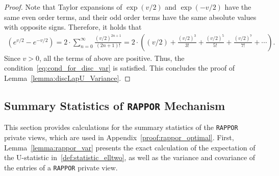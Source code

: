 \documentclass[twoside,11pt]{article}
\begin{document}
\begin{appendix}
\begin{lemma}
\begin{proof}
			Note that Taylor expansions of $\exp(v/2)$ and $\exp(-v/2)$ have the same even order terms, and their odd order terms have the same absolute values with opposite signs. Therefore, it holds that
			\begin{align*}
				(e^{v/2} - e^{-v/2} ) = 2 \cdot \sum_{n=0}^{\infty} \frac{\left(v/2\right)^{2n+1}}{(2n+1)!} = 
				2\cdot
				\left(
				(v/2)
				+ 
				\frac{(v/2)^3}{3!}
				+
				\frac{(v/2)^5}{5!}
				+
				\frac{(v/2)^7}{7!}
				+ \cdots 
				\right).
			\end{align*}
			Since $v>0$, all the terms of above are positive. Thus, the condition~\eqref{eq:cond_for_disc_var} is satisfied. This concludes the proof of Lemma~\ref{lemma:discLapU_Variance}. 
		\end{proof}
	\end{lemma}
	
	\subsection{Summary Statistics  of \texttt{RAPPOR} Mechanism}\label{appendix:rappor_moment}
	This section provides calculations for the summary statistics of the \texttt{RAPPOR} private views, which are used in Appendix~\ref{proof:rappor_optimal}. First, Lemma~\ref{lemma:rappor_var} presents the exact calculation of the expectation of the U-statistic in~\eqref{def:statistic_elltwo}, as well as the variance and covariance of the entries of a \texttt{RAPPOR} private view.
	

\end{appendix}
\end{document}
